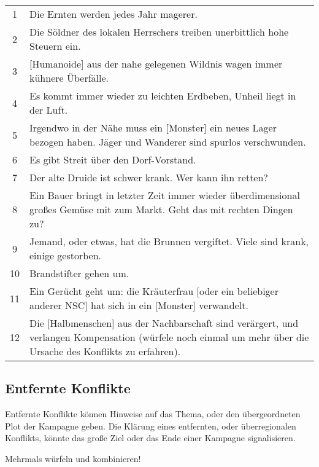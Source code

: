 \begin{tabularx}{\columnwidth}{cZ}
1 & Die Ernten werden jedes Jahr magerer.\\
2 & Die Söldner des lokalen Herrschers treiben unerbittlich hohe
Steuern ein. \\
3 & [Humanoide] aus der nahe gelegenen Wildnis wagen immer kühnere
Überfälle.\\
4 & Es kommt immer wieder zu leichten Erdbeben, Unheil liegt in der
Luft.\\
5 & Irgendwo in der Nähe muss ein [Monster] ein neues Lager bezogen
haben. Jäger und Wanderer sind spurlos verschwunden.\\
6 & Es gibt Streit über den Dorf-Vorstand.\\
7 & Der alte Druide ist schwer krank. Wer kann ihn retten?\\
8 & Ein Bauer bringt in letzter Zeit immer wieder überdimensional
großes Gemüse mit zum Markt. Geht das mit rechten Dingen zu?\\
9 & Jemand, oder etwas, hat die Brunnen vergiftet. Viele sind krank,
einige gestorben.\\
10 & Brandstifter gehen um.\\
11 & Ein Gerücht geht um: die Kräuterfrau [oder ein beliebiger
anderer NSC] hat sich in ein [Monster] verwandelt.\\
12 & Die [Halbmenschen] aus der Nachbarschaft sind verärgert, und
verlangen Kompensation (würfele noch einmal um mehr über die Ursache
des Konflikts zu erfahren).\\
\end{tabularx}

\subsection{Entfernte Konflikte}

Entfernte Konflikte können Hinweise auf das Thema, oder den
übergeordneten Plot der Kampagne geben. Die Klärung eines
entfernten, oder überregionalen Konflikts, könnte das 
große Ziel oder das Ende einer Kampagne signalisieren.

Mehrmals würfeln und kombinieren!

